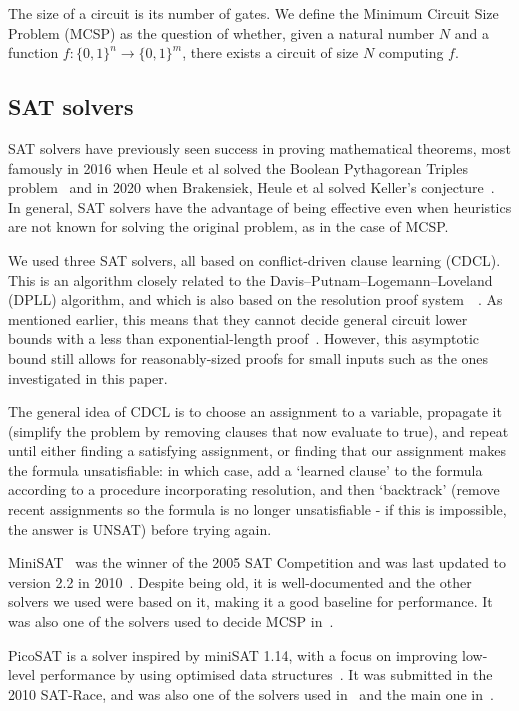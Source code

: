 \documentclass{article}
\begin{document}
The size of a circuit is its number of gates. We define the Minimum Circuit Size Problem (MCSP) as the question of whether, given a natural number $N$ and a function \(f: \{0,1\}^n \to \{0,1\}^m\), there exists a circuit of size $N$ computing \(f\).

\subsection{SAT solvers}

SAT solvers have previously seen success in proving mathematical theorems, most famously in 2016 when Heule et al solved the Boolean Pythagorean Triples problem~\cite{heule} and in 2020 when Brakensiek, Heule et al solved Keller's conjecture~\cite{heule2}. In general, SAT solvers have the advantage of being effective even when heuristics are not known for solving the original problem, as in the case of MCSP.

We used three SAT solvers, all based on conflict-driven clause learning (CDCL). This is an algorithm closely related to the Davis–Putnam–Logemann–Loveland (DPLL) algorithm, and which is also based on the resolution proof system~\cite{cdcl}~\cite{krajicek}. As mentioned earlier, this means that they cannot decide general circuit lower bounds with a less than exponential-length proof~\cite{raz}. However, this asymptotic bound still allows for reasonably-sized proofs for small inputs such as the ones investigated in this paper. 

The general idea of CDCL is to choose an assignment to a variable, propagate it (simplify the problem by removing clauses that now evaluate to true), and repeat until either finding a satisfying assignment, or finding that our assignment makes the formula unsatisfiable: in which case, add a `learned clause' to the formula according to a procedure incorporating resolution, and then `backtrack' (remove recent assignments so the formula is no longer unsatisfiable - if this is impossible, the answer is UNSAT) before trying again.

MiniSAT~\cite{minisat} was the winner of the 2005 SAT Competition and was last updated to version 2.2 in 2010~\cite{minisat2010}. Despite being old, it is well-documented and the other solvers we used were based on it, making it a good baseline for performance. It was also one of the solvers used to decide MCSP in~\cite{kulikov}.

PicoSAT is a solver inspired by miniSAT 1.14, with a focus on improving low-level performance by using optimised data structures~\cite{picosat}. It was submitted in the 2010 SAT-Race, and was also one of the solvers used in~\cite{kulikov} and the main one in~\cite{kulikovlocal}.
\end{document}
